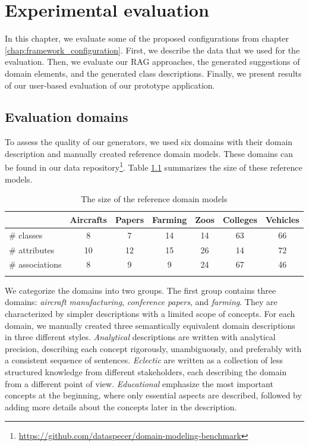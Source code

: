 \chapter{Experimental evaluation}
\label{chap:evaluation}

In this chapter, we evaluate some of the proposed configurations from chapter \ref{chap:framework_configuration}. First, we describe the data that we used for the evaluation. Then, we evaluate our RAG approaches, the generated suggestions of domain elements, and the generated class descriptions. Finally, we present results of our user-based evaluation of our prototype application.


\section{Evaluation domains}

To assess the quality of our generators, we used six domains with their domain description and manually created reference domain models. These domains can be found in our data repository\footnote{\url{https://github.com/dataspecer/domain-modeling-benchmark}}. Table \ref{tab:reference-model-size} summarizes the size of these reference models.

\begin{table}[!h]
    \scriptsize
    \centering
    \setlength{\tabcolsep}{0.5em}
    \begin{tabular}{lcccccc}
         & Aircrafts & Papers & Farming & Zoos & Colleges & Vehicles \\
    \toprule
    \addlinespace
         \# classes      & 8  & 7  & 14 & 14 & 63 & 66 \\
         \# attributes   & 10 & 12 & 15 & 26 & 14 & 72 \\
         \# associations & 8  & 9  & 9  & 24 & 67 & 46 \\
    \addlinespace
    \bottomrule
    \addlinespace
    \end{tabular}
    \caption{The size of the reference domain models}
    \label{tab:reference-model-size}
\end{table}


We categorize the domains into two groups.
The first group contains three domains: \emph{aircraft manufacturing}, \emph{conference papers}, and \emph{farming}.
They are characterized by simpler descriptions with a limited scope of concepts.
For each domain, we manually created three semantically equivalent domain descriptions in three different styles.
\emph{Analytical} descriptions are written with analytical precision, describing each concept rigorously, unambiguously, and preferably with a consistent sequence of sentences.
\emph{Eclectic} are written as a collection of less structured knowledge from different stakeholders, each describing the domain from a different point of view.
\emph{Educational} emphasize the most important concepts at the beginning, where only essential aspects are described, followed by adding more details about the concepts later in the description.

